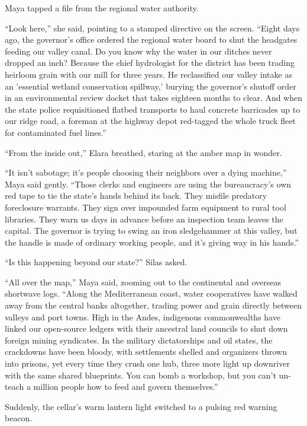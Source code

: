Maya tapped a file from the regional water authority.

``Look here,'' she said, pointing to a stamped directive on the screen. ``Eight days ago, the governor’s office ordered the regional water board to shut the headgates feeding our valley canal. Do you know why the water in our ditches never dropped an inch? Because the chief hydrologist for the district has been trading heirloom grain with our mill for three years. He reclassified our valley intake as an 'essential wetland conservation spillway,' burying the governor's shutoff order in an environmental review docket that takes eighteen months to clear. And when the state police requisitioned flatbed transports to haul concrete barricades up to our ridge road, a foreman at the highway depot red-tagged the whole truck fleet for contaminated fuel lines.''

``From the inside out,'' Elara breathed, staring at the amber map in wonder.

``It isn't sabotage; it's people choosing their neighbors over a dying machine,'' Maya said gently. ``Those clerks and engineers are using the bureaucracy's own red tape to tie the state's hands behind its back. They misfile predatory foreclosure warrants. They sign over impounded farm equipment to rural tool libraries. They warn us days in advance before an inspection team leaves the capital. The governor is trying to swing an iron sledgehammer at this valley, but the handle is made of ordinary working people, and it's giving way in his hands.''

``Is this happening beyond our state?'' Silas asked.

``All over the map,'' Maya said, zooming out to the continental and overseas shortwave logs. ``Along the Mediterranean coast, water cooperatives have walked away from the central banks altogether, trading power and grain directly between valleys and port towns. High in the Andes, indigenous commonwealths have linked our open-source ledgers with their ancestral land councils to shut down foreign mining syndicates. In the military dictatorships and oil states, the crackdowns have been bloody, with settlements shelled and organizers thrown into prisons, yet every time they crush one hub, three more light up downriver with the same shared blueprints. You can bomb a workshop, but you can't un-teach a million people how to feed and govern themselves.''

Suddenly, the cellar’s warm lantern light switched to a pulsing red warning beacon.

